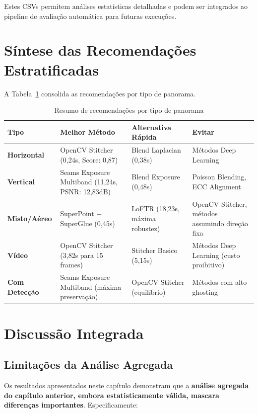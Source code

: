 Estes CSVs permitem análises estatísticas detalhadas e podem ser integrados ao pipeline de avaliação automática para futuras execuções.

\section{Síntese das Recomendações Estratificadas}

A Tabela~\ref{tab:recommendations-summary} consolida as recomendações por tipo de panorama.

\begin{table}[htb]
\centering
\caption{Resumo de recomendações por tipo de panorama}
\label{tab:recommendations-summary}
\footnotesize
\begin{tabular}{p{2.5cm}p{3.5cm}p{3.5cm}p{3cm}}
\hline
\textbf{Tipo} & \textbf{Melhor Método} & \textbf{Alternativa Rápida} & \textbf{Evitar} \\ \hline
\textbf{Horizontal} & OpenCV Stitcher (0,24s, Score: 0,87) & Blend Laplacian (0,38s) & Métodos Deep Learning \\
\hline
\textbf{Vertical} & Seams Exposure Multiband (11,24s, PSNR: 12,83dB) & Blend Exposure (0,48s) & Poisson Blending, ECC Alignment \\
\hline
\textbf{Misto/Aéreo} & SuperPoint + SuperGlue (0,45s) & LoFTR (18,23s, máxima robustez) & OpenCV Stitcher, métodos assumindo direção fixa \\
\hline
\textbf{Vídeo} & OpenCV Stitcher (3,82s para 15 frames) & Stitcher Basico (5,15s) & Métodos Deep Learning (custo proibitivo) \\
\hline
\textbf{Com Detecção} & Seams Exposure Multiband (máxima preservação) & OpenCV Stitcher (equilíbrio) & Métodos com alto ghosting \\
\hline
\end{tabular}
\end{table}

\section{Discussão Integrada}

\subsection{Limitações da Análise Agregada}

Os resultados apresentados neste capítulo demonstram que a \textbf{análise agregada do capítulo anterior, embora estatisticamente válida, mascara diferenças importantes}. Especificamente:

